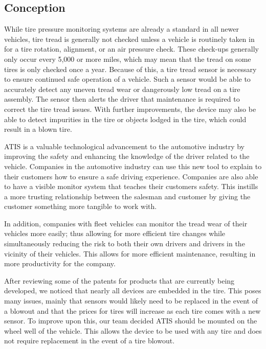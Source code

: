 \documentclass[11pt]{IEEEtran}
\begin{document}
		\subsection{Conception}
			While tire pressure monitoring systems are already a standard in all newer vehicles, tire tread is generally not checked unless a vehicle is routinely taken in for a tire rotation, alignment, or an air pressure check. These check-ups generally only occur every 5,000 or more miles, which may mean that the tread on some tires is only checked once a year. Because of this, a tire tread sensor is necessary to ensure continued safe operation of a vehicle. Such a sensor would be able to accurately detect any uneven tread wear or dangerously low tread on a tire assembly. The sensor then alerts the driver that maintenance is required to correct the tire tread issues. With further improvements, the device may also be able to detect impurities in the tire or objects lodged in the tire, which could result in a blown tire.

			ATIS is a valuable technological advancement to the automotive industry by improving the safety and enhancing the knowledge of the driver related to the vehicle. Companies in the automotive industry can use this new tool to explain to their customers how to ensure a safe driving experience. Companies are also able to have a visible monitor system that teaches their customers safety. This instills a more trusting relationship between the salesman and customer by giving the customer something more tangible to work with.

			In addition, companies with fleet vehicles can monitor the tread wear of their vehicles more easily; thus allowing for more efficient tire changes while simultaneously reducing the risk to both their own drivers and drivers in the vicinity of their vehicles. This allows for more efficient maintenance, resulting in more productivity for the company. 

			After reviewing some of the patents for products that are currently being developed, we noticed that nearly all devices are embedded in the tire. This poses many issues, mainly that sensors would likely need to be replaced in the event of a blowout and that the prices for tires will increase as each tire comes with a new sensor. To improve upon this, our team decided ATIS should be mounted on the wheel well of the vehicle. This allows the device to be used with any tire and does not require replacement in the event of a tire blowout.
\end{document}
